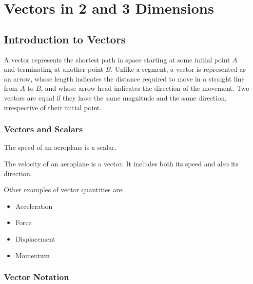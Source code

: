 \documentclass[11pt,a4paper]{book}
\begin{document}
\tableofcontents
\chapter{Vectors in 2 and 3 Dimensions}


\section{Introduction to Vectors}

A vector represents the shortest path in space starting at some initial
point $A$ and terminating at another point $B$. Unlike a segment,
a vector is represented as an arrow, whose length indicates the distance
required to move in a straight line from $A$ to $B$, and whose arrow
head indicates the direction of the movement. Two vectors are equal
if they have the same magnitude and the same direction, irrespective
of their initial point.

\subsection{Vectors and Scalars}
\begin{center}
\par\end{center}

The speed of an aeroplane is a scalar.

The velocity of an aeroplane is a vector. It includes both its speed
and also its direction.

Other examples of vector quantities are:
\begin{itemize}
\item Acceleration
\item Force
\item Displacement
\item Momentum
\end{itemize}

\subsection{Vector Notation}
\end{document}
